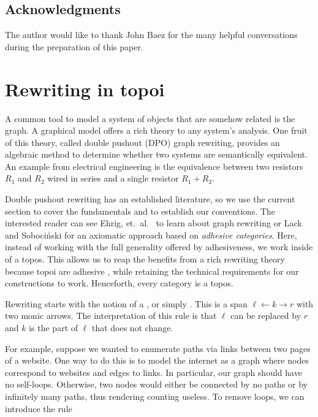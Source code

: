 \documentclass{amsart}
\begin{document}
\subsection{Acknowledgments}
\label{sec:acknowledgements}

The author would like to thank John Baez for the many
helpful conversations during the preparation of this paper.


\section{Rewriting in topoi}
\label{sec:RewriteTopoi}

A common tool to model a system of objects that
are somehow related is the graph. A
graphical model offers a rich theory to any
system's analysis. One fruit of this theory,
called double pushout (DPO) graph rewriting,
provides an algebraic method to determine whether
two systems are semantically equivalent. An
example from electrical engineering is the
equivalence between two resistors $ R_1 $ and $ R_2 $ wired in series
and a single resistor $ R_1 + R_2 $.

Double pushout rewriting has an established
literature, so we use the current section to cover
the fundamentals and to establish our conventions.
The interested reader can see Ehrig, et.\ al.\
\cite{Ehrig_GraphGram} to learn about graph
rewriting or Lack and Soboci\'{n}ski
\cite{LackSobo_Adhesive} for an axiomatic approach
based on \emph{adhesive categories}. Here, instead
of working with the full generality offered by
adhesiveness, we work inside of a
topos. This allows us to reap the benefits from a
rich rewriting theory because topoi are
adhesive \cite{LackSobo_TopsIsAdh}, while
retaining the technical requirements for our
constructions to work. Henceforth, every category
is a topos.

Rewriting starts with the notion of a , or
simply . This is a span $\ell \gets k \to r$
with two monic arrows. The interpretation of this rule is that
$ \ell $ can be replaced by $ r $ and $ k $ is the part of
$ \ell $ that does not change.

For example, suppose we wanted to enumerate paths
via links between two pages of a website. One way
to do this is to model the internet as a graph
where nodes correspond to websites and edges to
links.  In particular, our graph should have no
self-loops. Otherwise, two nodes would either be
connected by no paths or by infinitely many paths,
thus rendering counting useless.  To remove loops,
we can introduce the rule

\end{document}
